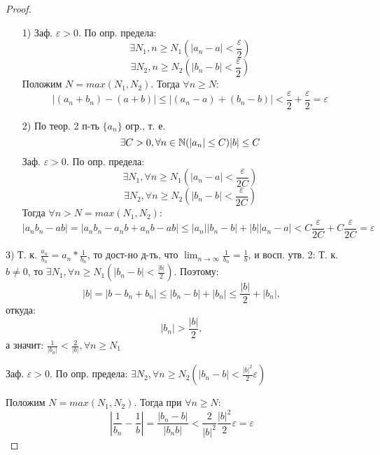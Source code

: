 \begin{proof}
    \begin{enumerate}
        \item [1) ] Заф. $\varepsilon > 0$. По опр. предела:
            \[
            \exists N_1, n \geq N_1 (|a_n - a| < \frac{\varepsilon}{2})
            \] 
            \[
            \exists N_2, n \geq N_2 (|b_n - b| < \frac{\varepsilon}{2})
            \] 
            Положим $N = max(N_1, N_2)$. Тогда $\forall n \geq N\colon $
            \[
            |(a_n + b_n) -(a + b)| \leq |(a_n - a) + (b_n - b)| < \frac{\varepsilon}{2} + \frac{\varepsilon}{2} = \varepsilon
            \] 
        \item [2) ] По теор. 2 п-ть $\{a_n\}$ огр., т. е.
            \[
            \exists C > 0, \forall n \in \mathbb{N} (|a_n| \leq C) |b| \leq C
            \] 
            Заф. $\varepsilon > 0$. По опр. предела:
            \[
            \exists N_1, \forall n \geq N_1 (|a_n - a| < \frac{\varepsilon}{2C})
            \] 
            \[
            \exists N_2, \forall n \geq N_2 (|b_n - b| < \frac{\varepsilon}{2C})
            \] 
            Тогда $\forall n > N = max(N_1, N_2)$:
\[
|a_n b_n - ab| = |a_n b_n -a_n b + a_n b - ab| \leq |a_n||b_n - b| + |b||a_n - a| < C \frac{\varepsilon}{2C} + C \frac{\varepsilon}{2C} = \varepsilon
\] 
    \end{enumerate}
  \item [3) ] Т. к. $\frac{a_n}{b_n} = a_n * \frac{1}{b_n}$, то дост-но д-ть, что $\lim_{n\to\infty}\frac{1}{b_n} = \frac{1}{b}$, и восп. утв. 2:
    Т. к. $b \neq 0$, то $\exists  N_1, \forall n \geq N_1 (|b_n - b| < \frac{|b|}{2})$. Поэтому:
\[
|b| = |b - b_n + b_n| \leq |b_n - b| + |b_n| \leq \frac{|b|}{2} + |b_n|,
\] 
откуда:
\[
|b_n| > \frac{|b|}{2},
\] 
а значит: $\frac{1}{|b_n|} < \frac{2}{|b|}, \forall n \geq N_1$

Заф. $\varepsilon > 0$. По опр. предела: $\exists N_2, \forall n \geq N_2 (|b_n - b| < \frac{|b|^{2}}{2}\varepsilon)$

Положим $N = max(N_1, N_2)$. Тогда при $\forall n \geq N$:
\[
\left|\frac{1}{b_n} - \frac{1}{b}\right| = \frac{|b_n - b|}{|b_n b|} < \frac{2}{|b|^{2}} \frac{|b|^{2}}{2}\varepsilon = \varepsilon
\] 
\end{proof}
